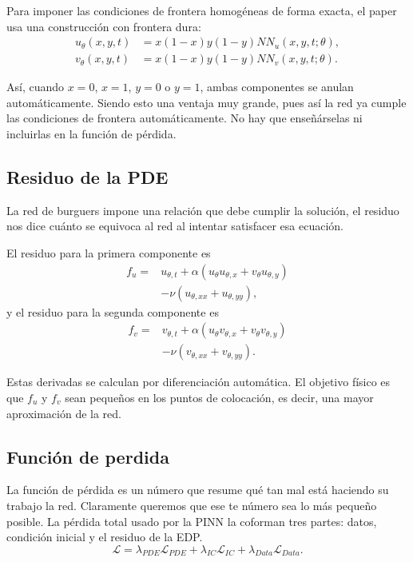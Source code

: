 \documentclass[10pt,letterpaper,twocolumn]{article}
\begin{document}
Para imponer las condiciones de frontera homogéneas de forma exacta, el paper usa una construcción con frontera dura:
\begin{align}
    u_\theta(x,y,t)&=x(1-x)y(1-y)NN_u(x,y,t;\theta),\\
    v_\theta(x,y,t)&=x(1-x)y(1-y)NN_v(x,y,t;\theta).
\end{align}

Así, cuando $x=0$, $x=1$, $y=0$ o $y=1$, ambas componentes se anulan automáticamente. Siendo esto una ventaja muy grande, pues así la red ya cumple las condiciones de frontera automáticamente. No hay que enseñárselas ni incluirlas en la función de pérdida.

\subsection{Residuo de la PDE}

La red de burguers impone una relación que debe cumplir la solución, el residuo nos dice cuánto se equivoca al red al intentar satisfacer esa ecuación.

El residuo para la primera componente es
\begin{equation}
\begin{split}
    f_u={}&u_{\theta,t}+\alpha\left(u_\theta u_{\theta,x}+v_\theta u_{\theta,y}\right)\\
    &-\nu\left(u_{\theta,xx}+u_{\theta,yy}\right),
\end{split}
\end{equation}
y el residuo para la segunda componente es
\begin{equation}
\begin{split}
    f_v={}&v_{\theta,t}+\alpha\left(u_\theta v_{\theta,x}+v_\theta v_{\theta,y}\right)\\
    &-\nu\left(v_{\theta,xx}+v_{\theta,yy}\right).
\end{split}
\end{equation}

Estas derivadas se calculan por diferenciación automática. El objetivo físico es que $f_u$ y $f_v$ sean pequeños en los puntos de colocación, es decir, una mayor aproximación de la red.

\subsection{Función de perdida}

La función de pérdida es un número que resume qué tan mal está haciendo su trabajo la red. Claramente queremos que ese te número sea lo más pequeño posible. 
La pérdida total usado por la PINN la coforman tres partes: datos, condición inicial y el residuo de la EDP.
\begin{equation}
    \mathcal{L}=\lambda_{PDE}\mathcal{L}_{PDE}+\lambda_{IC}\mathcal{L}_{IC}+\lambda_{Data}\mathcal{L}_{Data}.
\end{equation}
\end{document}
